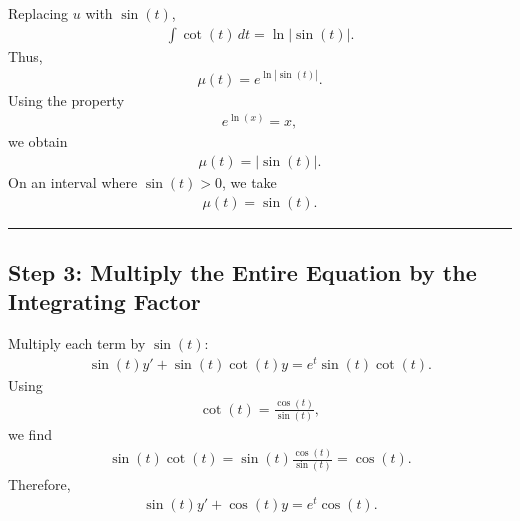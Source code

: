 \documentclass[letterpaper,10pt,english]{sphinxmanual}
\begin{document}
\sphinxAtStartPar
Replacing \(u\) with \(\sin(t)\),
\begin{equation*}
\begin{split}\int \cot(t)\,dt
=
\ln|\sin(t)|.\end{split}
\end{equation*}
\sphinxAtStartPar
Thus,
\begin{equation*}
\begin{split}\mu(t)
=
e^{\ln|\sin(t)|}.\end{split}
\end{equation*}
\sphinxAtStartPar
Using the property
\begin{equation*}
\begin{split}e^{\ln(x)}=x,\end{split}
\end{equation*}
\sphinxAtStartPar
we obtain
\begin{equation*}
\begin{split}\mu(t)=|\sin(t)|.\end{split}
\end{equation*}
\sphinxAtStartPar
On an interval where \(\sin(t)>0\), we take
\begin{equation*}
\begin{split}\boxed{\mu(t)=\sin(t)}.\end{split}
\end{equation*}

\bigskip\hrule\bigskip



\subsection{Step 3: Multiply the Entire Equation by the Integrating Factor}
\label{\detokenize{Language/Science_language/ODE_calculus/course_MATH_3035/homework_assignments/index_pdf:step-3-multiply-the-entire-equation-by-the-integrating-factor}}
\sphinxAtStartPar
Multiply each term by \(\sin(t)\):
\begin{equation*}
\begin{split}\sin(t)y'
+
\sin(t)\cot(t)y
=
e^t\sin(t)\cot(t).\end{split}
\end{equation*}
\sphinxAtStartPar
Using
\begin{equation*}
\begin{split}\cot(t)=\frac{\cos(t)}{\sin(t)},\end{split}
\end{equation*}
\sphinxAtStartPar
we find
\begin{equation*}
\begin{split}\sin(t)\cot(t)
=
\sin(t)\frac{\cos(t)}{\sin(t)}
=
\cos(t).\end{split}
\end{equation*}
\sphinxAtStartPar
Therefore,
\begin{equation*}
\begin{split}\sin(t)y'
+
\cos(t)y
=
e^t\cos(t).\end{split}
\end{equation*}
\end{document}
